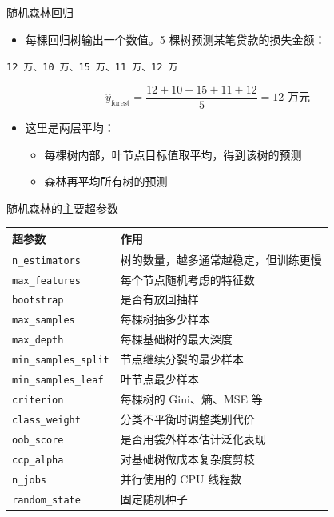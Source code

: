\documentclass[10pt,aspectratio=43]{beamer}
\begin{document}
\begin{frame}{随机森林回归}
  \begin{itemize}
    \item 每棵回归树输出一个数值。5 棵树预测某笔贷款的损失金额：
  \end{itemize}
  \begin{center}
    \texttt{12 万、10 万、15 万、11 万、12 万}
  \end{center}
  \[
    \hat{y}_{\text{forest}}=\frac{12+10+15+11+12}{5}=12\text{ 万元}
  \]
  \begin{itemize}
    \item 这里是两层平均：
      \begin{itemize}
        \item 每棵树内部，叶节点目标值取平均，得到该树的预测
        \item 森林再平均所有树的预测
      \end{itemize}
  \end{itemize}
\end{frame}

\begin{frame}{随机森林的主要超参数}
  \vspace{-1ex}
  \begin{center}
  \begin{tabular}{ll}
    \toprule
    超参数 & 作用 \\
    \midrule
    \texttt{n\_estimators} & 树的数量，越多通常越稳定，但训练更慢 \\
    \texttt{max\_features} & 每个节点随机考虑的特征数 \\
    \texttt{bootstrap} & 是否有放回抽样 \\
    \texttt{max\_samples} & 每棵树抽多少样本 \\
    \texttt{max\_depth} & 每棵基础树的最大深度 \\
    \texttt{min\_samples\_split} & 节点继续分裂的最少样本 \\
    \texttt{min\_samples\_leaf} & 叶节点最少样本 \\
    \texttt{criterion} & 每棵树的 Gini、熵、MSE 等 \\
    \texttt{class\_weight} & 分类不平衡时调整类别代价 \\
    \texttt{oob\_score} & 是否用袋外样本估计泛化表现 \\
    \texttt{ccp\_alpha} & 对基础树做成本复杂度剪枝 \\
    \texttt{n\_jobs} & 并行使用的 CPU 线程数 \\
    \texttt{random\_state} & 固定随机种子 \\
    \bottomrule
  \end{tabular}
  \end{center}
\end{frame}
\end{document}
